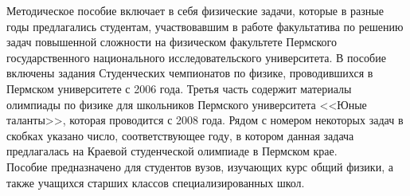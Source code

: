 Методическое пособие включает в себя физические задачи, которые в разные годы предлагались студентам, участвовавшим в работе факультатива по решению задач повышенной сложности на физическом факультете Пермского государственного национального исследовательского университета. В пособие включены задания Студенческих чемпионатов по физике, проводившихся в Пермском университете с 2006 года. Третья часть содержит материалы олимпиады по физике для школьников Пермского университета <<Юные таланты>>, которая проводится с 2008 года. Рядом с номером некоторых задач в скобках указано число, соответствующее году, в котором данная задача предлагалась на Краевой студенческой олимпиаде в Пермском крае. \\
\indent Пособие предназначено для студентов вузов, изучающих курс общий физики, а также учащихся старших классов специализированных школ.